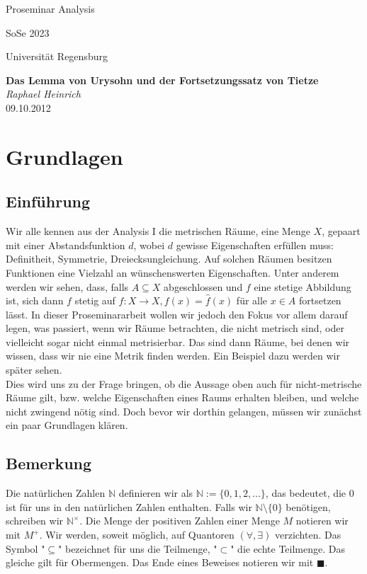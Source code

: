 \documentclass[11pt,leqno]{article}
\newcommand{\N}{\mathbb{N}}
\begin{document}
\noindent \small Proseminar Analysis

\vspace{-1cm}
\begin{flushright}SoSe 2023

Universit\"at Regensburg
\end{flushright}
\normalsize
\vspace{0.2cm}
\begin{center}
{\bf \Large Das Lemma von Urysohn und der Fortsetzungssatz von Tietze}\\[0.3cm]
{\it Raphael Heinrich}\\[0.2cm]
{09.10.2012}\\[0.4cm]
\end{center}

\section{Grundlagen}
\subsection{Einführung}
Wir alle kennen aus der Analysis I die metrischen Räume, eine Menge $X$, gepaart mit einer Abstandsfunktion $d$, wobei $d$ gewisse 
Eigenschaften erfüllen muss: Definitheit, Symmetrie, Dreiecksungleichung. Auf solchen Räumen besitzen Funktionen eine Vielzahl an 
wünschenswerten Eigenschaften. Unter anderem werden wir sehen, dass, falls $A \subseteq X$ abgeschlossen und $f$ eine stetige Abbildung 
ist, sich dann $f$ stetig auf $\hat{f}:X \xrightarrow{} X, f(x)=\hat{f}(x)$ für alle $x \in A$ fortsetzen lässt. In dieser Proseminararbeit 
wollen wir jedoch den Fokus vor allem darauf legen, was passiert, wenn wir Räume betrachten, die nicht metrisch sind, oder vielleicht sogar nicht
einmal metrisierbar. Das sind dann Räume, bei denen wir wissen, dass wir nie eine Metrik finden werden. Ein Beispiel dazu werden wir später sehen.\\
Dies wird uns zu der Frage bringen, ob die Aussage oben auch für nicht-metrische Räume gilt, bzw. welche Eigenschaften eines Raums 
erhalten bleiben, und welche nicht zwingend nötig sind. Doch bevor wir dorthin gelangen, müssen wir zunächst ein paar Grundlagen klären.

\subsection{Bemerkung}
Die natürlichen Zahlen $\N$ definieren wir als $\N := \{0,1,2, ... \}$, das bedeutet, die 0 ist für uns in den natürlichen Zahlen enthalten. 
Falls wir $\N \setminus \{0\}$ benötigen, schreiben wir $\N^\times$. Die Menge der positiven Zahlen einer Menge $M$ notieren wir mit $M^{+}$.
Wir werden, soweit möglich, auf Quantoren $(\forall, \exists)$ verzichten. Das Symbol "$\subseteq$" bezeichnet für uns die Teilmenge, 
"$\subset$" die echte Teilmenge. Das gleiche gilt für Obermengen.
Das Ende eines Beweises notieren wir mit $\blacksquare$.
\end{document}
